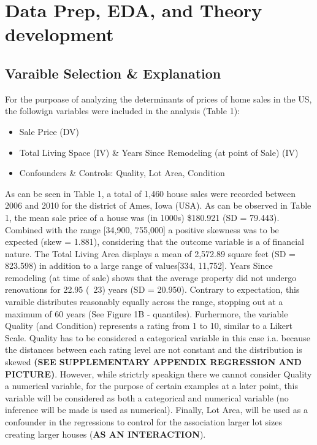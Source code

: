 \documentclass[a4paper]{article}
\begin{document}
\section{Data Prep, EDA, and Theory development}
\subsection{Varaible Selection \& Explanation}
For the purpoase of analyzing the determinants of prices of home sales in the US, the followign variables were included in the analysis (Table 1): 


\begin{itemize}
  \item Sale Price (DV)
  \item Total Living Space (IV) \& Years Since Remodeling (at point of Sale) (IV)
  \item Confounders \& Controls: Quality, Lot Area, Condition
\end{itemize}


As can be seen in Table 1, a total of 1,460 house sales were recorded between 2006 and 2010 for the district of Ames, Iowa (USA).
As can be observed in Table 1, the mean sale price of a house was (in 1000s) \$180.921 (SD = 79.443). Combined with the range [34,900, 755,000] a positive skewness was to be expected (skew = 1.881), considering that the outcome variable is a of financial nature. The Total Living Area displays a mean of 2,572.89 square feet (SD = 823.598) in addition to a large range of values[334, 11,752].  
Years Since remodeling (at time of sale) shows that the average property did not undergo renovations for 22.95 (~23) years (SD = 20.950). Contrary to expectation, this varaible distributes reasonably equally across the range, stopping out at a maximum of 60 years (See Figure 1B - quantiles).
Furhermore, the variable Quality (and Condition) represents a rating from 1 to 10, similar to a Likert Scale. Quality has to be considered a categorical variable in this case i.a. because the distances between each rating level are not constant and the distribution is skewed \textbf{(SEE SUPPLEMENTARY APPENDIX REGRESSION AND PICTURE)}. However, while strictrly speakign there we cannot consider Quality a numerical variable, for the purpose of certain examples at a later point, this variable will be considered as both a categorical and numerical variable (no inference will be made is used as numerical). Finally, Lot Area, will be used as a confounder in the regressions to control for the association larger lot sizes creating larger houses (\textbf{AS AN INTERACTION}). 
\end{document}

